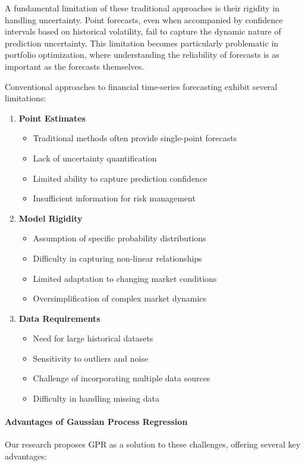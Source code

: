 A fundamental limitation of these traditional approaches is their rigidity in handling uncertainty. Point forecasts, even when accompanied by confidence intervals based on historical volatility, fail to capture the dynamic nature of prediction uncertainty. This limitation becomes particularly problematic in portfolio optimization, where understanding the reliability of forecasts is as important as the forecasts themselves.

Conventional approaches to financial time-series forecasting exhibit several limitations:

\begin{enumerate}
    \item \textbf{Point Estimates}
    \begin{itemize}
        \item Traditional methods often provide single-point forecasts
        \item Lack of uncertainty quantification
        \item Limited ability to capture prediction confidence
        \item Insufficient information for risk management
    \end{itemize}

    \item \textbf{Model Rigidity}
    \begin{itemize}
        \item Assumption of specific probability distributions
        \item Difficulty in capturing non-linear relationships
        \item Limited adaptation to changing market conditions
        \item Oversimplification of complex market dynamics
    \end{itemize}

    \item \textbf{Data Requirements}
    \begin{itemize}
        \item Need for large historical datasets
        \item Sensitivity to outliers and noise
        \item Challenge of incorporating multiple data sources
        \item Difficulty in handling missing data
    \end{itemize}
\end{enumerate}

\paragraph{Advantages of Gaussian Process Regression}
Our research proposes GPR as a solution to these challenges, offering several key advantages:


